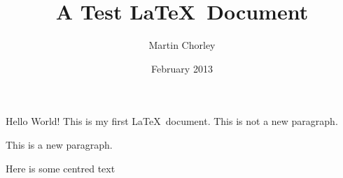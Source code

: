 \documentclass[12pt,twoside,a4paper]{article}
\title{A Test \LaTeX\ Document}
\author{Martin Chorley}
\date{February 2013}
\begin{document}
\maketitle

Hello World! This is       my       first       \LaTeX\     document.
This is not a new paragraph.

This is a new paragraph.
\begin{center}Here is some centred text\end{center}

\lipsum
\end{document}
